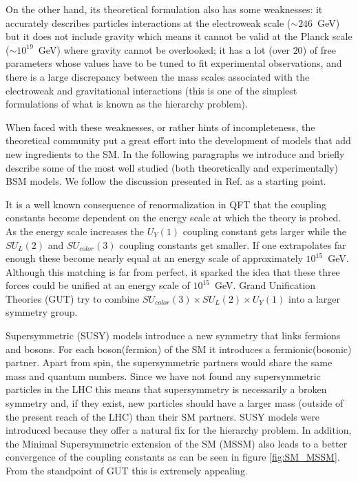 On the other hand, its theoretical formulation also has some weaknesses: it accurately describes particles interactions at the electroweak scale ($\sim 246$~GeV) but it does not include gravity which means it cannot be valid at the Planck scale ($\sim 10^{19}$~GeV) where gravity cannot be overlooked; it has a lot (over $20$) of free parameters whose values have to be tuned to fit experimental observations, and there is a large discrepancy between the mass scales associated with the electroweak and gravitational interactions (this is one of the simplest formulations of what is known as the hierarchy problem).

When faced with these weaknesses, or rather hints of incompleteness, the theoretical community put a great effort into the development of models that add new ingredients to the SM. In the following paragraphs we introduce and briefly describe some of the most well studied (both theoretically and experimentally) BSM models. We follow the discussion presented in Ref. \cite{BSM_motivation} as a starting point.

It is a well known consequence of renormalization in QFT that the coupling constants become dependent on the energy scale at which the theory is probed. As the energy scale increases the $U_Y(1)$ coupling constant gets larger while the $SU_L(2)$ and $SU_{color}(3)$ coupling constants get smaller. If one extrapolates far enough these become nearly equal at an energy scale of approximately $10^{15}$~GeV. Although this matching is far from perfect, it sparked the idea that these three forces could be unified at an energy scale of $10^{15}$~GeV. Grand Unification Theories (GUT) try to combine $SU_{color}(3)\times SU_L(2)\times U_Y(1)$ into a larger symmetry group.

Supersymmetric (SUSY) models introduce a new symmetry that links fermions and bosons. For each boson(fermion) of the SM it introduces a fermionic(bosonic) partner. Apart from spin, the supersymmetric partners would share the same mass and quantum numbers. Since we have not found any supersymmetric particles in the LHC this means that supersymmetry is necessarily a broken symmetry and, if they exist, new particles should have a larger mass (outside of the present reach of the LHC) than their SM partners. SUSY models were introduced because they offer a natural fix for the hierarchy problem. In addition, the Minimal Supersymmetric extension of the SM (MSSM) also leads to a better convergence of the coupling constants as can be seen in figure \ref{fig:SM_MSSM}. From the standpoint of GUT this is extremely appealing.

